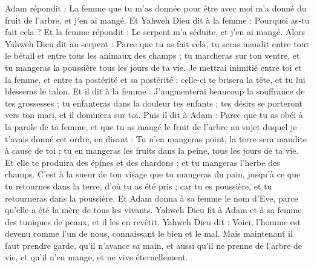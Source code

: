 \begin{multicols}{2}
Adam répondit : La femme que tu m'as donnée pour être avec moi m'a donné du fruit de l'arbre, et j'en ai mangé.
Et Yahweh Dieu dit à la femme : Pourquoi as-tu fait cela ? Et la femme répondit : Le serpent m'a séduite, et j'en ai mangé.
Alors Yahweh Dieu dit au serpent : Parce que tu as fait cela, tu seras maudit entre tout le bétail et entre tous les animaux des champs ; tu marcheras sur ton ventre, et tu mangeras la poussière tous les jours de ta vie.
Je mettrai inimitié entre toi et la femme, et entre ta postérité et sa postérité ; celle-ci te brisera la tête, et tu lui blesseras le talon.
Et il dit à la femme : J'augmenterai beaucoup la souffrance de tes grossesses ; tu enfanteras dans la douleur tes enfants ; tes désirs se porteront vers ton mari, et il dominera sur toi.
Puis il dit à Adam : Parce que tu as obéi à la parole de ta femme, et que tu as mangé le fruit de l'arbre au sujet duquel je t'avais donné cet ordre, en disant : Tu n'en mangeras point, la terre sera maudite à cause de toi ; tu en mangeras les fruits dans la peine, tous les jours de ta vie.
Et elle te produira des épines et des chardons ; et tu mangeras l'herbe des champs.
C’est à la sueur de ton visage que tu mangeras du pain, jusqu'à ce que tu retournes dans la terre, d’où tu as été pris ; car tu es poussière, et tu retourneras dans la poussière.
Et Adam donna à sa femme le nom d’Eve, parce qu'elle a été la mère de tous les vivants.
Yahweh Dieu fit à Adam et à sa femme des tuniques de peaux, et il les en revêtit.
Yahweh Dieu dit : Voici, l'homme est devenu comme l'un de nous, connaissant le bien et le mal. Mais maintenant il faut prendre garde, qu’il n’avance sa main, et aussi qu’il ne prenne de l'arbre de vie, et qu’il n’en mange, et ne vive éternellement.

\end{multicols}
